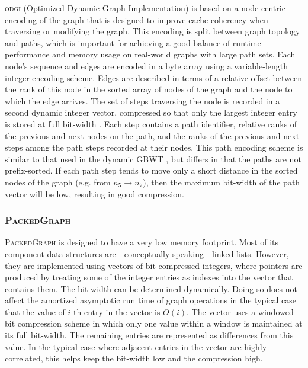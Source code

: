 \documentclass{bioinfo}
\begin{document}
\begin{methods}
\textsc{odgi} (Optimized Dynamic Graph Implementation) is based on a node-centric encoding of the graph that is designed to improve cache coherency when traversing or modifying the graph.
This encoding is split between graph topology and paths, which is important for achieving a good balance of runtime performance and memory usage on real-world graphs with large path sets.
Each node's sequence and edges are encoded in a byte array using a variable-length integer encoding scheme.
Edges are described in terms of a relative offset between the rank of this node in the sorted array of nodes of the graph and the node to which the edge arrives.
The set of steps traversing the node is recorded in a second dynamic integer vector, compressed so that only the largest integer entry is stored at full bit-width \citep{prezza2017framework}.
Each step contains a path identifier, relative ranks of the previous and next nodes on the path, and the ranks of the previous and next steps among the path steps recorded at their nodes.
This path encoding scheme is similar to that used in the dynamic GBWT \citep{Siren_2019}, but differs in that the paths are not prefix-sorted.
If each path step tends to move only a short distance in the sorted nodes of the graph (e.g. from $n_{5} \to n_{7}$), then the maximum bit-width of the path vector will be low, resulting in good compression.

\subsubsection{\textsc{PackedGraph}}

\textsc{PackedGraph} is designed to have a very low memory footprint.
Most of its component data structures are---conceptually speaking---linked lists.
However, they are implemented using vectors of bit-compressed integers, where pointers are produced by treating some of the integer entries as indexes into the vector that contains them.
The bit-width can be determined dynamically.
Doing so does not affect the amortized asymptotic run time of graph operations in the typical case that the value of $i$-th entry in the vector is $O(i)$.
The vector uses a windowed bit compression scheme in which only one value within a window is maintained at its full bit-width.
The remaining entries are represented as differences from this value.
In the typical case where adjacent entries in the vector are highly correlated, this helps keep the bit-width low and the compression high.


\end{methods}
\end{document}
